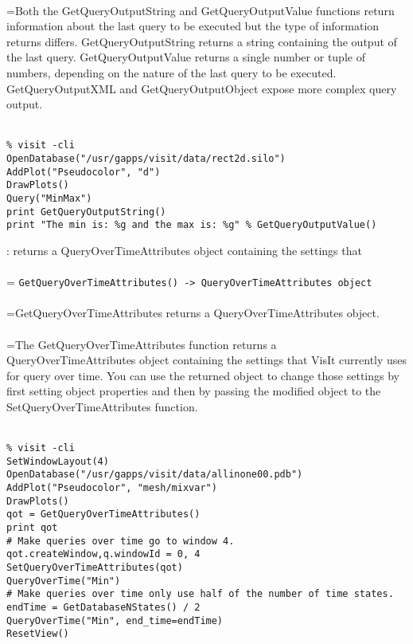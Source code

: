 \documentclass[10pt,a4paper]{report}
\begin{document}
 \\ 
\hangindent=\parindent Both the GetQueryOutputString and GetQueryOutputValue functions return information about the last query to be executed but the type of information returns differs. GetQueryOutputString returns a string containing the output of the last query. GetQueryOutputValue returns a single number or tuple of numbers, depending on the nature of the last query to be executed.  GetQueryOutputXML and GetQueryOutputObject expose more complex query output. \\[-3mm] 

\\[-6mm]
\begin{verbatim}% visit -cli
OpenDatabase("/usr/gapps/visit/data/rect2d.silo")
AddPlot("Pseudocolor", "d")
DrawPlots()
Query("MinMax")
print GetQueryOutputString()
print "The min is: %g and the max is: %g" % GetQueryOutputValue()
\end{verbatim}
\newpage


{}
: returns a QueryOverTimeAttributes object containing the settings that\\[-3mm]

 \\ 
\hangindent=\parindent 
\verb!GetQueryOverTimeAttributes() -> QueryOverTimeAttributes object!\\ [-3mm]

 \\ 
\hangindent=\parindent GetQueryOverTimeAttributes returns a QueryOverTimeAttributes object. \\[-3mm] 

 \\ 
\hangindent=\parindent The GetQueryOverTimeAttributes function returns a QueryOverTimeAttributes object containing the settings that VisIt currently uses for query over time. You can use the returned object to change those settings by first setting object properties and then by passing the modified object to the SetQueryOverTimeAttributes function. \\[-3mm] 

\\[-6mm]
\begin{verbatim}% visit -cli
SetWindowLayout(4)
OpenDatabase("/usr/gapps/visit/data/allinone00.pdb")
AddPlot("Pseudocolor", "mesh/mixvar")
DrawPlots()
qot = GetQueryOverTimeAttributes()
print qot
# Make queries over time go to window 4.
qot.createWindow,q.windowId = 0, 4
SetQueryOverTimeAttributes(qot)
QueryOverTime("Min")
# Make queries over time only use half of the number of time states.
endTime = GetDatabaseNStates() / 2
QueryOverTime("Min", end_time=endTime)
ResetView()
\end{verbatim}
\newpage
\end{document}
